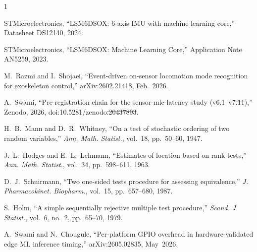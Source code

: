 \documentclass{IEEE_lsens}
\providecommand{\DIFadd}[1]{{\protect\color{blue}\uwave{#1}}} %
\providecommand{\DIFdel}[1]{{\protect\color{red}\sout{#1}}}                      %
\providecommand{\DIFaddbegin}{} %
\providecommand{\DIFaddend}{} %
\providecommand{\DIFdelbegin}{} %
\providecommand{\DIFdelend}{} %
\newcommand{\DIFscaledelfig}{0.5}
\newlength{\DIFdelgraphicswidth} %
\newlength{\DIFdelgraphicsheight} %
\newcommand{\DIFaddincludegraphics}[2][]{{\color{blue}\fbox{\DIFOincludegraphics[#1]{#2}}}} %
\newcommand{\DIFdelincludegraphics}[2][]{%
\sbox{\DIFdelgraphicsbox}{\DIFOincludegraphics[#1]{#2}}%
\settoboxwidth{\DIFdelgraphicswidth}{\DIFdelgraphicsbox} %
\settoboxtotalheight{\DIFdelgraphicsheight}{\DIFdelgraphicsbox} %
\scalebox{\DIFscaledelfig}{%
\parbox[b]{\DIFdelgraphicswidth}{\usebox{\DIFdelgraphicsbox}\\[-\baselineskip] \rule{\DIFdelgraphicswidth}{0em}}\llap{\resizebox{\DIFdelgraphicswidth}{\DIFdelgraphicsheight}{%
\setlength{\unitlength}{\DIFdelgraphicswidth}%
\begin{picture}(1,1)%
\thicklines\linethickness{2pt} %
{\color[rgb]{1,0,0}\put(0,0){\framebox(1,1){}}}%
{\color[rgb]{1,0,0}\put(0,0){\line( 1,1){1}}}%
{\color[rgb]{1,0,0}\put(0,1){\line(1,-1){1}}}%
\end{picture}%
}\hspace*{3pt}}} %
} %
\DeclareRobustCommand{\DIFaddbegin}{\DIFOaddbegin \let\includegraphics\DIFaddincludegraphics} %
\DeclareRobustCommand{\DIFaddend}{\DIFOaddend \let\includegraphics\DIFOincludegraphics} %
\DeclareRobustCommand{\DIFdelbegin}{\DIFOdelbegin \let\includegraphics\DIFdelincludegraphics} %
\DeclareRobustCommand{\DIFdelend}{\DIFOaddend \let\includegraphics\DIFOincludegraphics} %
\begin{document}
\begin{thebibliography}{1}

 STMicroelectronics, ``LSM6DSOX: 6-axis IMU with machine learning core,'' Datasheet DS12140, 2024.

 STMicroelectronics, ``LSM6DSOX: Machine Learning Core,'' Application Note AN5259, 2023.

 M.~Razmi and I.~Shojaei, ``Event-driven on-sensor locomotion mode recognition for exoskeleton control,'' arXiv:2602.21418, Feb.\ 2026.

 A.~Swami, ``Pre-registration chain for the sensor-mlc-latency study (v6.1--v7\DIFdelbegin \DIFdel{.11}\DIFdelend \DIFaddbegin \DIFadd{.13}\DIFaddend ),'' Zenodo, 2026, doi:10.5281/zenodo\DIFdelbegin \DIFdel{.20437893}\DIFdelend \DIFaddbegin \DIFadd{.22907600}\DIFaddend .

 H.~B.~Mann and D.~R.~Whitney, ``On a test of stochastic ordering of two random variables,'' \emph{Ann. Math. Statist.}, vol.~18, pp.~50--60, 1947.

 J.~L.~Hodges and E.~L.~Lehmann, ``Estimates of location based on rank tests,'' \emph{Ann. Math. Statist.}, vol.~34, pp.~598--611, 1963.

 D.~J.~Schuirmann, ``Two one-sided tests procedure for assessing equivalence,'' \emph{J. Pharmacokinet. Biopharm.}, vol.~15, pp.~657--680, 1987.

 S.~Holm, ``A simple sequentially rejective multiple test procedure,'' \emph{Scand. J. Statist.}, vol.~6, no.~2, pp.~65--70, 1979.

 A.~Swami and N.~Chougule, ``Per-platform GPIO overhead in hardware-validated edge ML inference timing,'' arXiv:2605.02835, May~2026.

\end{thebibliography}
\end{document}

